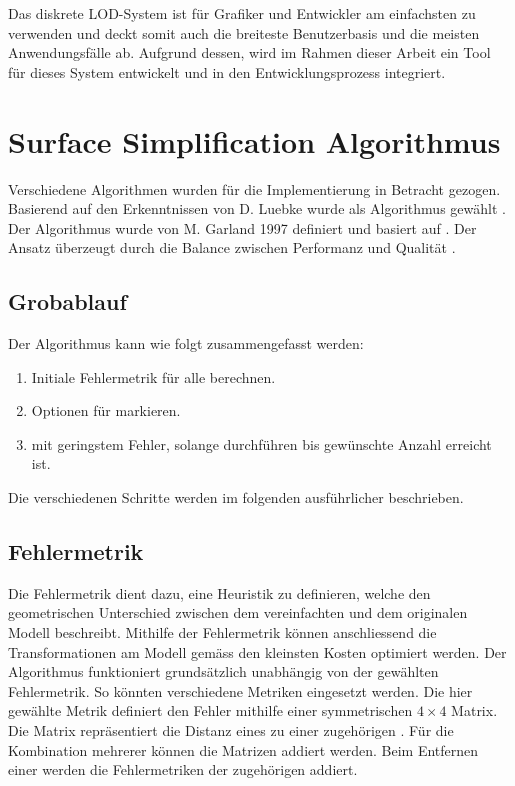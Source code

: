 Das diskrete LOD-System ist für Grafiker und Entwickler am einfachsten zu verwenden und deckt somit auch die breiteste Benutzerbasis und die meisten Anwendungsfälle ab. Aufgrund dessen, wird im Rahmen dieser Arbeit ein Tool für dieses System entwickelt und in den Entwicklungsprozess integriert.

\section{Surface Simplification Algorithmus}
\label{chap:surfaceSimplificationAlgorithm}
Verschiedene Algorithmen wurden für die Implementierung in Betracht gezogen. Basierend auf den Erkenntnissen von D. Luebke wurde als Algorithmus  gewählt \cite{luebkeAlgorithmComparison}. Der Algorithmus wurde von M. Garland 1997 definiert und basiert auf . Der Ansatz überzeugt durch die Balance zwischen Performanz und Qualität \cite{surfaceSimplificationUsingQuadricErrorMetrices, surfaceSimplificationWithColorUsingQuadricErrorMetrices}.

\subsection{Grobablauf}
Der Algorithmus kann wie folgt zusammengefasst werden:

\begin{enumerate}
  \item Initiale Fehlermetrik für alle  berechnen.
  \item Optionen für  markieren.
  \item {} mit geringstem Fehler, solange durchführen bis gewünschte Anzahl  erreicht ist.
\end{enumerate}

Die verschiedenen Schritte werden im folgenden ausführlicher beschrieben.

\subsection{Fehlermetrik}
Die Fehlermetrik dient dazu, eine Heuristik zu definieren, welche den geometrischen Unterschied zwischen dem vereinfachten und dem originalen Modell beschreibt.
Mithilfe der Fehlermetrik können anschliessend die Transformationen am Modell gemäss den kleinsten Kosten optimiert werden. Der Algorithmus funktioniert grundsätzlich unabhängig von der gewählten Fehlermetrik. So könnten verschiedene Metriken eingesetzt werden.
Die hier gewählte Metrik definiert den Fehler mithilfe einer symmetrischen $4\times 4$ Matrix. Die Matrix repräsentiert die Distanz eines  zu einer zugehörigen . Für die Kombination mehrerer  können die Matrizen addiert werden. Beim Entfernen einer  werden die Fehlermetriken der zugehörigen  addiert.

